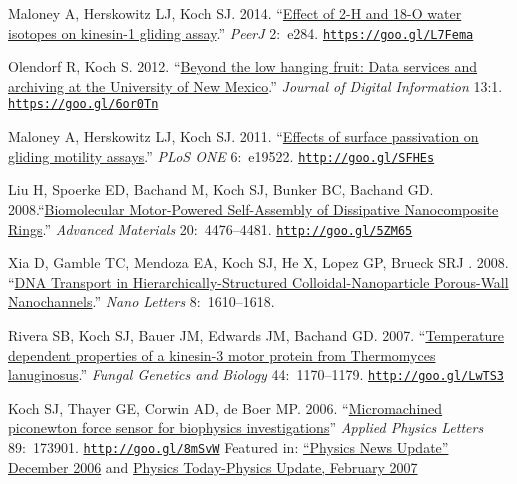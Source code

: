 \documentclass[11pt]{article}
\begin{document}
\ind Maloney A, Herskowitz LJ, Koch SJ. 2014. ``\href{https://goo.gl/L7Fema}{Effect of 2-H and 18-O water isotopes on kinesin-1 gliding assay}.'' \emph{PeerJ} 2:~e284. {\scriptsize  \texttt{\href{https://goo.gl/L7Fema}{https://goo.gl/L7Fema}}}


\ind Olendorf R, Koch S. 2012. ``\href{https://goo.gl/6or0Tn}{Beyond the low hanging fruit: Data services and archiving at the University of New Mexico}.'' \emph{Journal of Digital Information} 13:1. {\scriptsize  \texttt{\href{https://goo.gl/6or0Tn}{https://goo.gl/6or0Tn}}}


\ind Maloney A, Herskowitz LJ, Koch SJ. 2011. ``\href{http://goo.gl/SFHEs}{Effects of surface passivation on gliding motility assays}.'' \emph{PLoS ONE} 6:~e19522. {\scriptsize  \texttt{\href{http://goo.gl/SFHEs}{http://goo.gl/SFHEs}}}


\ind Liu H, Spoerke ED, Bachand M, Koch SJ, Bunker BC, Bachand GD. 2008.\newline ``\href{http://goo.gl/5ZM65}{Biomolecular Motor-Powered Self-Assembly of Dissipative Nanocomposite Rings}.'' \emph{Advanced Materials} 20:~4476–4481. {\scriptsize  \texttt{\href{http://goo.gl/5ZM65}{http://goo.gl/5ZM65}}}


\ind Xia D, Gamble TC, Mendoza EA, Koch SJ, He X, Lopez GP, Brueck SRJ . 2008. ``\href{http://goo.gl/F0RiL}{DNA Transport in Hierarchically-Structured Colloidal-Nanoparticle \newline Porous-Wall Nanochannels}.''
 \emph{Nano Letters} 8:~1610–1618. 


\ind Rivera SB, Koch SJ, Bauer JM, Edwards JM, Bachand GD. 2007. ``\href{http://goo.gl/LwTS3}{Temperature dependent properties of a kinesin-3 motor protein from Thermomyces lanuginosus}.'' \emph{Fungal Genetics and Biology} 44:~1170–1179. {\scriptsize  \texttt{\href{http://goo.gl/LwTS3}{http://goo.gl/LwTS3}}}


\ind Koch SJ, Thayer GE, Corwin AD, de Boer MP. 2006. ``\href{http://goo.gl/8mSvW}{Micromachined piconewton force sensor for biophysics investigations}'' \newline \emph{Applied Physics Letters} 89:~173901. {\scriptsize  \texttt{\href{http://goo.gl/8mSvW}{http://goo.gl/8mSvW}}} \newline Featured in: \href{http://goo.gl/2m7LF}{“Physics News Update” December 2006} and \href{http://goo.gl/lYdCy}{Physics Today-Physics Update, February 2007}  
\end{document}

